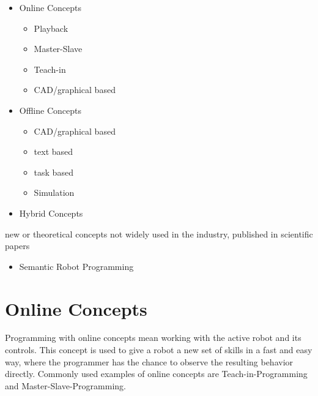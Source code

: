 \documentclass[conference]{IEEEtran}
\begin{document}
 \begin{itemize}
    \item Online Concepts
        \begin{itemize}
            \item Playback
            \item Master-Slave
            \item Teach-in
            \item CAD/graphical based
        \end{itemize}
    \item Offline Concepts
        \begin{itemize}
            \item CAD/graphical based
            \item text based
            \item task based
            \item Simulation
        \end{itemize}
    \item Hybrid Concepts
 \end{itemize}    

new or theoretical concepts
not widely used in the industry, published in scientific papers

\begin{itemize}
    \item Semantic Robot Programming
\end{itemize}

\section{Online Concepts}

Programming with online concepts mean working with the active robot and its controls. %
This concept is used to give a robot a new set of skills in a fast and easy way, where the programmer has the chance to observe the resulting behavior directly.
Commonly used examples of online concepts are Teach-in-Programming and Master-Slave-Programming. %

\end{document}
